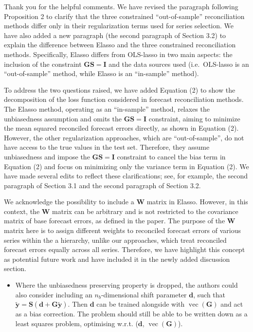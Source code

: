 \documentclass[11pt,a4paper,]{article}
\providecommand{\tightlist}{%
  \setlength{\itemsep}{0pt}\setlength{\parskip}{0pt}}
\renewenvironment{quote}
               {\list{}{\rightmargin\leftmargin}%
                \item\relax\color[RGB]{0,150,0}}
               {\endlist}
\begin{document}
\begin{quote}
Thank you for the helpful comments. We have revised the paragraph
following Proposition 2 to clarify that the three constrained
``out-of-sample'' reconciliation methods differ only in their
regularization terms used for series selection. We have also added a new
paragraph (the second paragraph of Section 3.2) to explain the
difference between Elasso and the three constrained reconciliation
methods. Specifically, Elasso differs from OLS-lasso in two main
aspects: the inclusion of the constraint \(\bm{GS}=\bm{I}\) and the data
sources used (i.e.~OLS-lasso is an ``out-of-sample'' method, while
Elasso is an ``in-sample'' method).

To address the two questions raised, we have added Equation (2) to show
the decomposition of the loss function considered in forecast
reconciliation methods. The Elasso method, operating as an ``in-sample''
method, relaxes the unbiasedness assumption and omits the
\(\bm{GS}=\bm{I}\) constraint, aiming to minimize the mean squared
reconciled forecast errors directly, as shown in Equation (2). However,
the other regularization approaches, which are ``out-of-sample'', do not
have access to the true values in the test set. Therefore, they assume
unbiasedness and impose the \(\bm{GS}=\bm{I}\) constraint to cancel the
bias term in Equation (2) and focus on minimizing only the variance term
in Equation (2). We have made several edits to reflect these
clarifications; see, for example, the second paragraph of Section 3.1
and the second paragraph of Section 3.2.

We acknowledge the possibility to include a \(\bm{W}\) matrix in Elasso.
However, in this context, the \(\bm{W}\) matrix can be arbitrary and is
not restricted to the covariance matrix of base forecast errors, as
defined in the paper. The purpose of the \(\bm{W}\) matrix here is to
assign different weights to reconciled forecast errors of various series
within the a hierarchy, unlike our approaches, which treat reconciled
forecast errors equally across all series. Therefore, we have highlight
this concept as potential future work and have included it in the newly
added discussion section.
\end{quote}

\begin{itemize}
\tightlist
\item
  Where the unbiasedness preserving property is dropped, the authors
  could also consider including an \(n_b\)-dimensional shift parameter
  \(\bm{d}\), such that
  \(\tilde{\bm{y}}=\bm{S}(\bm{d}+\bm{G}\tilde{\bm{y}})\). Then
  \(\bm{d}\) can be trained alongside with
  \(\operatorname{vec}(\bm{G})\) and act as a bias correction. The
  problem should still be able to be written down as a least squares
  problem, optimising w.r.t. (\(\bm{d}\),
  \(\operatorname{vec}(\bm{G})\)).
\end{itemize}
\end{document}
